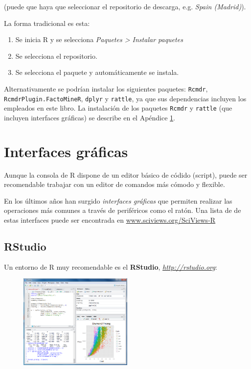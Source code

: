 \documentclass[]{book}
\begin{document}
(puede que haya que seleccionar el repositorio de descarga, e.g.
\emph{Spain (Madrid)}).

La forma tradicional es esta:

\begin{enumerate}
\def\labelenumi{\arabic{enumi}.}
\item
  Se inicia R y se selecciona \emph{Paquetes \textgreater{} Instalar
  paquetes}
\item
  Se selecciona el repositorio.
\item
  Se selecciona el paquete y automáticamente se instala.
\end{enumerate}

Alternativamente se podrían instalar los siguientes paquetes:
\texttt{Rcmdr}, \texttt{RcmdrPlugin.FactoMineR}, \texttt{dplyr} y
\texttt{rattle}, ya que sus dependencias incluyen los empleados en este
libro. La instalación de los paquetes \texttt{Rcmdr} y \texttt{rattle}
(que incluyen interfaces gráficas) se describe en el Apéndice
\ref{interfaces}.

\chapter{Interfaces gráficas}\label{interfaces}

Aunque la consola de R dispone de un editor básico de códido (script),
puede ser recomendable trabajar con un editor de comandos más cómodo y
flexible.

En los últimos años han surgido \emph{interfaces gráficas} que permiten
realizar las operaciones más comunes a través de periféricos como el
ratón. Una lista de de estas interfaces puede ser encontrada en
\url{www.sciviews.org/SciViews-R}

\section{RStudio}\label{rstudio}

Un entorno de R muy recomendable es el \textbf{RStudio},
\href{http://rstudio.org}{\emph{http://rstudio.org}}:

\begin{figure}
\centering
\includegraphics[width=0.50000\textwidth]{figuras/RStudio-screenshot.png}
\caption{}
\end{figure}
\end{document}
